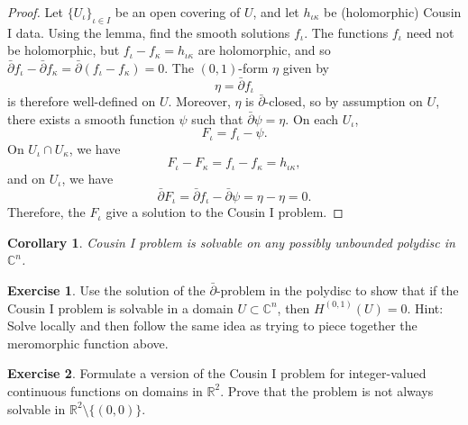 \documentclass[12pt,openany]{book}
\newcommand{\C}{{\mathbb{C}}}
\newcommand{\R}{{\mathbb{R}}}
\theoremstyle{plain}
\newtheorem{cor}[thm]{Corollary}
\theoremstyle{remark}
\theoremstyle{definition}
\newenvironment{exbox}{%
    \def\FrameCommand{\vrule width 1pt \relax\hspace{10pt}}%
    \MakeFramed{\advance\hsize-\width\FrameRestore}%
}{%
    \endMakeFramed
}
\theoremstyle{exercise}
\newtheorem{exercise}{Exercise}[section]
\theoremstyle{example}
\begin{document}
\begin{proof}
Let
$\{ U_{\iota} \}_{\iota \in I}$ be an open covering of $U$,
and let $h_{\iota\kappa}$ be (holomorphic) Cousin I
data.
Using the lemma, find the smooth solutions $f_\iota$.
The functions $f_\iota$ need not be holomorphic, but
$f_\iota-f_\kappa = h_{\iota\kappa}$ are holomorphic, and so
$\bar{\partial}f_\iota-\bar{\partial}f_\kappa = \bar{\partial}(f_\iota-f_\kappa) = 0$.  The $(0,1)$-form $\eta$ given by
\begin{equation*}
\eta = \bar{\partial}f_\iota
\end{equation*}
is therefore well-defined on $U$.  Moreover, $\eta$ is
$\bar{\partial}$-closed, so by assumption on $U$,
there exists a smooth function $\psi$ such that $\bar{\partial}\psi = \eta$.
On each $U_\iota$,
\begin{equation*}
F_\iota = f_\iota - \psi .
\end{equation*}
On $U_\iota \cap U_\kappa$, we have
\begin{equation*}
F_\iota - F_\kappa = f_\iota-f_\kappa = h_{\iota \kappa} ,
\end{equation*}
and on $U_\iota$, we have
\begin{equation*}
\bar{\partial}F_\iota = \bar{\partial}f_\iota - \bar{\partial}\psi =
\eta-\eta  = 0.
\end{equation*}
Therefore, the $F_{\iota}$ give a solution to the Cousin I problem.
\end{proof}

\begin{cor}
Cousin I problem is solvable on any possibly unbounded polydisc in~$\C^n$.
\end{cor}

\begin{exbox}
\begin{exercise}
Use the solution of the $\bar{\partial}$-problem in the polydisc to show that
if the Cousin I problem is solvable in a domain $U \subset \C^n$, then
$H^{(0,1)}(U) = 0$.  Hint: Solve locally and then follow the same idea
as trying to piece together the meromorphic function above.
\end{exercise}

\begin{exercise}
Formulate a version of the Cousin I problem for integer-valued continuous
functions on domains in $\R^2$.  Prove that the problem is
not always solvable in $\R^2 \setminus \{ (0,0) \}$.
\end{exercise}
\end{exbox}
\end{document}

